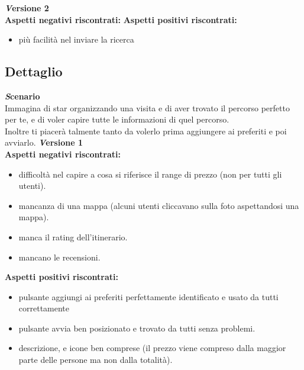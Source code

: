 \textbf{\emph Versione 2}\\
\textbf{Aspetti negativi riscontrati:}
\newline\newline
\textbf{Aspetti positivi riscontrati:}
\begin{itemize}[label=-]

\item più facilità nel inviare la ricerca

\end{itemize}


\subsection{Dettaglio}
\textbf{\emph Scenario}\\
Immagina di star organizzando una visita e di aver trovato il percorso perfetto per te,
e di voler capire tutte le informazioni di quel percorso.\\
Inoltre ti piacerà talmente tanto da volerlo prima aggiungere ai preferiti e poi avviarlo.
\newline
\textbf{\emph Versione 1}\\
\textbf{Aspetti negativi riscontrati:}
\begin{itemize}[label=-]

\item difficoltà nel capire a cosa si riferisce il range di prezzo (non per tutti gli utenti).
\item mancanza di una mappa (alcuni utenti cliccavano sulla foto aspettandosi una mappa).
\item manca il rating dell’itinerario.
\item mancano le recensioni.

\end{itemize}

\textbf{Aspetti positivi riscontrati:}
\begin{itemize}[label=-]

\item pulsante aggiungi ai preferiti perfettamente identificato e usato da tutti correttamente
\item pulsante avvia ben posizionato e trovato da tutti senza problemi.
\item descrizione, e icone ben comprese (il prezzo viene compreso dalla maggior parte delle persone ma non dalla totalità).

\end{itemize}

